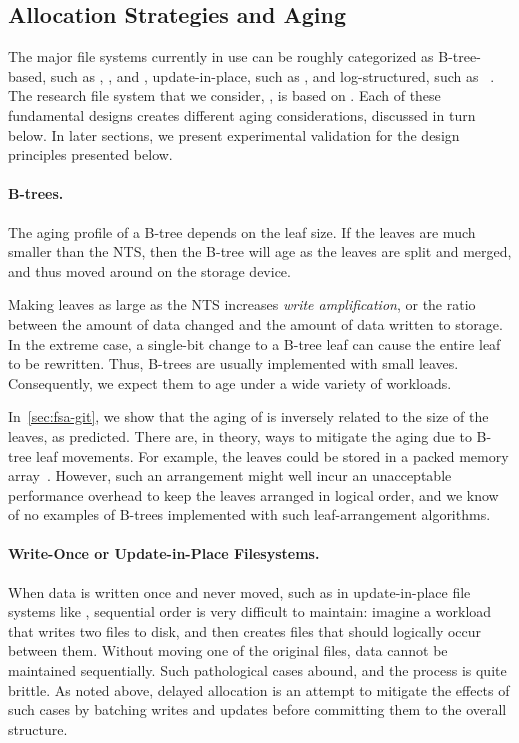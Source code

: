 \subsection{Allocation Strategies and Aging}\label{sec:fsa-allocation}

The major file systems currently in use can be roughly  categorized as
B-tree-based, such as \xfs, \zfs, and \btrfs,  update-in-place, such as \ext,
and log-structured, such as \ftwofs~\cite{DBLP:conf/fast/LeeSHC15}.  The
research file system that we consider, \betrfs, is based on \bets.  Each of
these fundamental designs creates different aging considerations, discussed in
turn below.  In later sections, we present experimental validation for the
design principles presented below.

\paragraph{B-trees.}
The aging profile of a B-tree depends on the leaf size.  If the
leaves are much smaller than the NTS, then the
B-tree will age as the leaves are split and merged, and thus moved
around on the storage device.

Making leaves as large as the  NTS increases \emph{write amplification}, or the
ratio between the amount of data changed and the amount of data written to
storage.  In the extreme case, a single-bit change to a B-tree leaf can cause
the entire leaf to be rewritten.  Thus, B-trees are usually implemented with
small leaves.  Consequently, we expect them to age under a wide variety of
workloads.

In~\cref{sec:fsa-git}, we show that the aging of \btrfs is inversely related to
the size of the leaves, as predicted.  There are, in theory, ways to mitigate
the aging due to B-tree leaf movements.  For example, the leaves could be
stored in a packed memory array~\cite{DBLP:journals/siamcomp/BenderDF05}.
However, such an arrangement might well incur an unacceptable performance
overhead to keep the leaves arranged in logical order, and we know of no
examples of B-trees implemented with such leaf-arrangement algorithms.

\paragraph{Write-Once or Update-in-Place Filesystems.}  
When data is written once and never moved, such as in update-in-place file
systems like \ext, sequential order is very difficult to maintain: imagine a
workload that writes two files to disk, and then creates files that should
logically occur between them. Without moving one of the original files, data
cannot be maintained sequentially.  Such pathological cases abound, and the
process is quite brittle. As noted above, delayed allocation is an attempt to
mitigate the effects of such cases by batching writes and updates before
committing them to the overall structure. 

